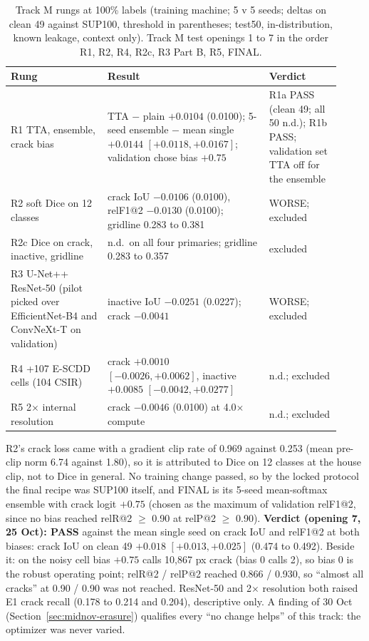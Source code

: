 \begin{table}[htbp]
\centering
\footnotesize
\caption[Track M rungs at 100\% labels (24 to 25 Oct)]{Track M rungs at 100\% labels (training machine; 5 v 5 seeds; deltas on
clean 49 against SUP100, threshold in parentheses; test50, in-distribution, known leakage, context only). Track M test openings
1 to 7 in the order R1, R2, R4, R2c, R3 Part B, R5, FINAL.}
\label{tab:midnov-trackm}
\begin{tabular}{@{}p{0.27\linewidth}p{0.45\linewidth}p{0.20\linewidth}@{}}
\toprule
Rung & Result & Verdict \\
\midrule
R1 TTA, ensemble, crack bias & TTA $-$ plain $+0.0104$ (0.0100); 5-seed ensemble $-$ mean single $+0.0144$ $[+0.0118, +0.0167]$; validation chose bias $+0.75$ & R1a PASS (clean 49; all 50 n.d.); R1b PASS; validation set TTA off for the ensemble \\
R2 soft Dice on 12 classes & crack IoU $-0.0106$ (0.0100), relF1@2 $-0.0130$ (0.0100); gridline 0.283 to 0.381 & WORSE; excluded \\
R2c Dice on crack, inactive, gridline & n.d.\ on all four primaries; gridline 0.283 to 0.357 & excluded \\
R3 U-Net++ ResNet-50 (pilot picked over EfficientNet-B4 and ConvNeXt-T on validation) & inactive IoU $-0.0251$ (0.0227); crack $-0.0041$ & WORSE; excluded \\
R4 +107 E-SCDD cells (104 CSIR) & crack $+0.0010$ $[-0.0026, +0.0062]$, inactive $+0.0085$ $[-0.0042, +0.0277]$ & n.d.; excluded \\
R5 2$\times$ internal resolution & crack $-0.0046$ (0.0100) at 4.0$\times$ compute & n.d.; excluded \\
\bottomrule
\end{tabular}
\end{table}

R2's crack loss came with a gradient clip rate of 0.969 against 0.253 (mean pre-clip norm 6.74 against 1.80), so it is attributed to Dice
on 12 classes at the house clip, not to Dice in general. No training change passed, so by the locked protocol the final recipe was
SUP100 itself, and FINAL is its 5-seed mean-softmax ensemble with crack logit $+0.75$ (chosen as the maximum of validation relF1@2,
since no bias reached relR@2 $\geq$ 0.90 at relP@2 $\geq$ 0.90). \textbf{Verdict (opening 7, 25 Oct): PASS} against the mean single
seed on crack IoU and relF1@2 at both biases: crack IoU on clean 49 $+0.018$ $[+0.013, +0.025]$ (0.474 to 0.492). Beside it: on the
noisy cell bias $+0.75$ calls 10,867 px crack (bias 0 calls 2), so bias 0 is the robust operating point; relR@2 / relP@2 reached
0.866 / 0.930, so ``almost all cracks'' at 0.90 / 0.90 was not reached. ResNet-50 and 2$\times$ resolution both raised E1 crack
recall (0.178 to 0.214 and 0.204), descriptive only. A finding of 30 Oct (Section~\ref{sec:midnov-erasure}) qualifies every
``no change helps'' of this track: the optimizer was never varied.

